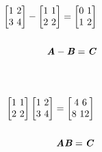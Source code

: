 \documentclass[12pt]{minimal}
\begin{document}
\begin{equation}
    \begin{split}
        \begin{bmatrix}
            1\ 2\\
            3\ 4\\
        \end{bmatrix} -
        \begin{bmatrix}
            1\ 1\\
            2\ 2\\
        \end{bmatrix} =
        \begin{bmatrix}
            0\ 1\\
            1\ 2\\
        \end{bmatrix} \\ \\
        \textbf{\textit{A}}-\textbf{\textit{B}}=\textbf{\textit{C}} 
    \end{split} 
\end{equation} \\ \\ 


\begin{equation}
    \begin{split}
        \begin{bmatrix}
            1\ 1\\
            2\ 2\\
        \end{bmatrix}
        \begin{bmatrix}
            1\ 2\\
            3\ 4\\
        \end{bmatrix} = 
        \begin{bmatrix}
            4\ 6\\
            8\ 12\\
        \end{bmatrix} \\ \\
        \textbf{\textit{A}}\textbf{\textit{B}} = \textbf{\textit{C}} 
    \end{split}
\end{equation} \\ \\
\end{document}
